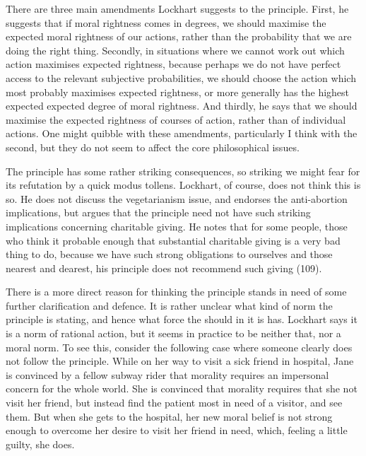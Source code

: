 \documentclass[
  11pt,
  letterpaper,
  DIV=11,
  numbers=noendperiod,
  twoside]{scrartcl}
\begin{document}
There are three main amendments Lockhart suggests to the principle.
First, he suggests that if moral rightness comes in degrees, we should
maximise the expected moral rightness of our actions, rather than the
probability that we are doing the right thing. Secondly, in situations
where we cannot work out which action maximises expected rightness,
because perhaps we do not have perfect access to the relevant subjective
probabilities, we should choose the action which most probably maximises
expected rightness, or more generally has the highest expected expected
degree of moral rightness. And thirdly, he says that we should maximise
the expected rightness of courses of action, rather than of individual
actions. One might quibble with these amendments, particularly I think
with the second, but they do not seem to affect the core philosophical
issues.

The principle has some rather striking consequences, so striking we
might fear for its refutation by a quick modus tollens. Lockhart, of
course, does not think this is so. He does not discuss the vegetarianism
issue, and endorses the anti-abortion implications, but argues that the
principle need not have such striking implications concerning charitable
giving. He notes that for some people, those who think it probable
enough that substantial charitable giving is a very bad thing to do,
because we have such strong obligations to ourselves and those nearest
and dearest, his principle does not recommend such giving (109).

There is a more direct reason for thinking the principle stands in need
of some further clarification and defence. It is rather unclear what
kind of norm the principle is stating, and hence what force the should
in it is has. Lockhart says it is a norm of rational action, but it
seems in practice to be neither that, nor a moral norm. To see this,
consider the following case where someone clearly does not follow the
principle. While on her way to visit a sick friend in hospital, Jane is
convinced by a fellow subway rider that morality requires an impersonal
concern for the whole world. She is convinced that morality requires
that she not visit her friend, but instead find the patient most in need
of a visitor, and see them. But when she gets to the hospital, her new
moral belief is not strong enough to overcome her desire to visit her
friend in need, which, feeling a little guilty, she does.
\end{document}
